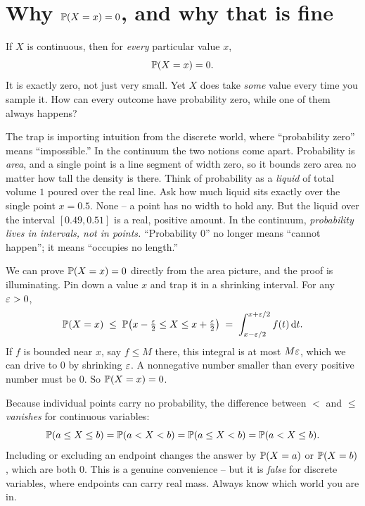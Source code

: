 \section{Why \texorpdfstring{$\P(X=x)=0$}{P(X=x)=0}, and why that is fine}
\label{ch10:point-mass-zero}

If $X$ is continuous, then
for \emph{every} particular value $x$,
\[
  \P(X = x) = 0 .
\]
It is exactly zero, not just very small. Yet $X$ does take \emph{some} value every time
you sample it. How can every outcome have probability zero, while one of them
always happens?

\begin{happeningbox}
The trap is importing intuition from the discrete world, where ``probability zero''
means ``impossible.'' In the continuum the two notions come apart. Probability is
\emph{area}, and a single point is a line segment of width zero, so it bounds zero
area no matter how tall the density is there. Think of probability as a
\emph{liquid} of total volume $1$ poured over the real line. Ask how much liquid
sits exactly over the single point $x=0.5$. None -- a point has no width to hold any.
But the liquid over the interval $[0.49,0.51]$ is a real, positive amount. In the
continuum, \emph{probability lives in intervals, not in points.} ``Probability $0$''
no longer means ``cannot happen''; it means ``occupies no length.''
\end{happeningbox}

We can prove $\P(X=x)=0$ directly from the area picture, and the proof is
illuminating. Pin down a value $x$ and trap it in a shrinking interval. For any
$\eps > 0$,
\[
  \P(X = x) \;\le\; \P\!\left(x - \tfrac{\eps}{2} \le X \le x + \tfrac{\eps}{2}\right)
  \;=\; \int_{x-\eps/2}^{x+\eps/2} f(t)\,\dd t .
\]
If $f$ is bounded near $x$, say $f \le M$ there, this integral is at most $M\eps$,
which we can drive to $0$ by shrinking $\eps$. A nonnegative number smaller than
every positive number must be $0$. So $\P(X=x)=0$.

\begin{trapbox}
Because individual points carry no probability, the difference between $<$ and
$\le$ \emph{vanishes} for continuous variables:
\[
  \P(a \le X \le b) = \P(a < X < b) = \P(a \le X < b) = \P(a < X \le b).
\]
Including or excluding an endpoint changes the answer by $\P(X=a)$ or $\P(X=b)$,
which are both $0$. This is a genuine convenience -- but it is \emph{false} for
discrete variables, where endpoints can carry real mass. Always know which world
you are in.
\end{trapbox}

